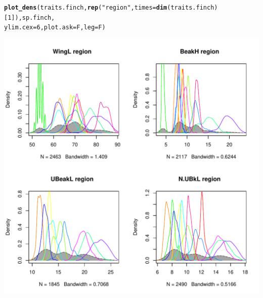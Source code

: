 \documentclass[12pt]{article}\usepackage[]{graphicx}\usepackage[]{color}
\makeatletter
\def\maxwidth{ %
  \ifdim\Gin@nat@width>\linewidth
    \linewidth
  \else
    \Gin@nat@width
  \fi
}
\newcommand{\hlnum}[1]{\textcolor[rgb]{0.686,0.059,0.569}{#1}}%
\newcommand{\hlstr}[1]{\textcolor[rgb]{0.192,0.494,0.8}{#1}}%
\newcommand{\hlstd}[1]{\textcolor[rgb]{0.345,0.345,0.345}{#1}}%
\newcommand{\hlkwc}[1]{\textcolor[rgb]{0.333,0.667,0.333}{#1}}%
\newcommand{\hlkwd}[1]{\textcolor[rgb]{0.737,0.353,0.396}{\textbf{#1}}}%
\newenvironment{kframe}{%
 \def\at@end@of@kframe{}%
 \ifinner\ifhmode%
  \def\at@end@of@kframe{\end{minipage}}%
  \begin{minipage}{\columnwidth}%
 \fi\fi%
 \def\FrameCommand##1{\hskip\@totalleftmargin \hskip-\fboxsep
 \colorbox{shadecolor}{##1}\hskip-\fboxsep
     \hskip-\linewidth \hskip-\@totalleftmargin \hskip\columnwidth}%
 \MakeFramed {\advance\hsize-\width
   \@totalleftmargin\z@ \linewidth\hsize
   \@setminipage}}%
 {\par\unskip\endMakeFramed%
 \at@end@of@kframe}
\newenvironment{knitrout}{}{} %
\makeatother
\begin{document}
\begin{knitrout}
\color{fgcolor}\begin{kframe}
\begin{alltt}
\hlkwd{plot_dens}\hlstd{(traits.finch,} \hlkwd{rep}\hlstd{(}\hlstr{"region"}\hlstd{,} \hlkwc{times} \hlstd{=} \hlkwd{dim}\hlstd{(traits.finch)[}\hlnum{1}\hlstd{]), sp.finch,}
    \hlkwc{ylim.cex} \hlstd{=} \hlnum{6}\hlstd{,} \hlkwc{plot.ask} \hlstd{= F,} \hlkwc{leg} \hlstd{= F)}
\end{alltt}
\end{kframe}
\includegraphics[width=\maxwidth]{figure/unnamed-chunk-6} 

\end{knitrout}
\end{document}
